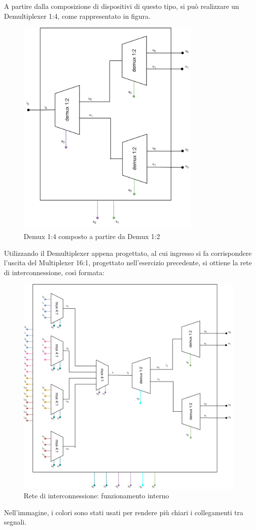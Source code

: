 A partire dalla composizione di dispositivi di questo tipo, si può realizzare un Demultiplexer 1:4, come rappresentato in figura.
\begin{figure}[H]
	\centering
	\includegraphics[width=0.8\textwidth]{img/demux_1_4}
	\caption{Demux 1:4 composto a partire da Demux 1:2}
	\label{Demux 1:2} 
\end{figure}
Utilizzando il Demultiplexer appena progettato, al cui ingresso si fa corrispondere l'uscita del Multiplexer 16:1, progettato nell'esercizio precedente, si ottiene la rete di interconnessione, così formata:
\begin{figure}[H]
	\centering
	\includegraphics[width=1\textwidth]{img/ReteInterconn_composta}
	\caption{Rete di interconnessione: funzionamento interno}
	\label{Demux 1:2} 
\end{figure}
Nell'immagine, i colori sono stati usati per rendere più chiari i collegamenti tra segnali.

